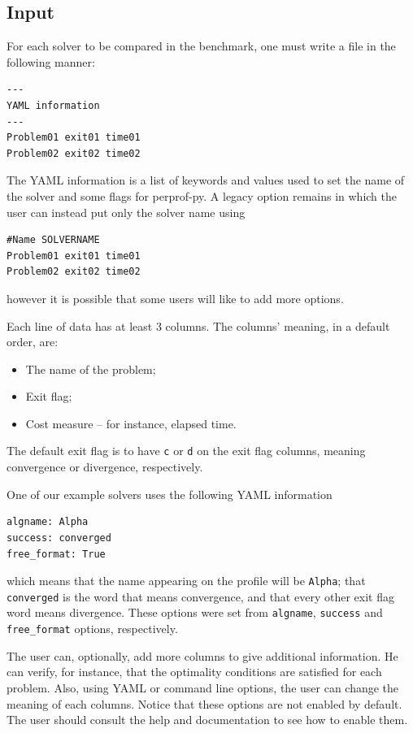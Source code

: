 \subsection*{Input}

    For each solver to be compared in the benchmark, one must write a file in
    the following manner:

    \begin{verbatim}
---
YAML information
---
Problem01 exit01 time01
Problem02 exit02 time02
    \end{verbatim}

    The YAML\cite{url:yaml,url:pyyaml} information is a list of keywords and values used to
    set the name of the solver and some
    flags for perprof-py.
    A legacy option remains in which the user can instead put only the
    solver name using
\begin{verbatim}
#Name SOLVERNAME
Problem01 exit01 time01
Problem02 exit02 time02
\end{verbatim}
    however it is possible that some users  will like to
    add more options.

    Each line of data has at least 3 columns.
    The columns' meaning, in a default order, are:
    \begin{itemize}
      \item The name of the problem;
      \item Exit flag;
      \item Cost measure -- for instance, elapsed time.
    \end{itemize}
    The default exit flag is to have {\tt c} or {\tt d} on the exit flag
    columns, meaning convergence or divergence, respectively.

    One of our example solvers uses the following YAML information
\begin{verbatim}
algname: Alpha
success: converged
free_format: True
\end{verbatim}
    which means that the name appearing on the profile will be {\tt Alpha};
    that {\tt converged} is the word that means convergence,
    and that every other exit flag word means divergence.
    These options were set from {\tt algname}, {\tt success} and {\tt
    free\_format} options, respectively.

    The user can, optionally, add more columns to give additional information.
    He can verify, for instance, that the optimality conditions are satisfied
    for each problem.
    Also, using  YAML or  command line options, the user can change the
    meaning of each columns.
    Notice that these options are not enabled by default. The user should
    consult the help and documentation to see how to enable them.


